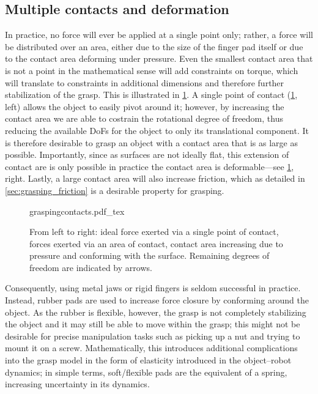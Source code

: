 \subsection{Multiple contacts and deformation}\label{sec:grasping_deformation}

In practice, no force will ever be applied at a single point only; rather, a force will be distributed over an area, either due to the size of the finger pad itself or due to the contact area deforming under pressure.
Even the smallest contact area that is not a point in the mathematical sense will add constraints on torque, which will translate to constraints in additional dimensions and therefore further stabilization of the grasp. This is illustrated in \cref{fig:contactarea}.
A single point of contact (\cref{fig:contactarea}, left) allows the object to easily pivot around it; however, by increasing the contact area we are able to costrain the rotational degree of freedom, thus reducing the available DoFs for the object to only its translational component.
It is therefore desirable to grasp an object with a contact area that is as large as possible. Importantly, since as surfaces are not ideally flat, this extension of contact are is only possible in practice the contact area is deformable---see \cref{fig:contactarea}, right. Lastly, a large contact area will also increase friction, which as detailed in \cref{sec:grasping_friction} is a desirable property for grasping.

\begin{figure}
    \def\svgwidth{\textwidth}
    {graspingcontacts.pdf_tex}
    \caption{From left to right: ideal force exerted via a single point of contact, forces exerted via an area of contact, contact area increasing due to pressure and conforming with the surface. Remaining degrees of freedom are indicated by arrows. \label{fig:contactarea}}
\end{figure}

Consequently, using metal jaws or rigid fingers is seldom successful in practice. Instead, rubber pads are used to increase force closure by conforming around the object. As the rubber is flexible, however, the grasp is not completely stabilizing the object and it may still be able to move within the grasp; this might not be desirable for precise manipulation tasks such as picking up a nut and trying to mount it on a screw. Mathematically, this introduces additional complications into the grasp model in the form of elasticity introduced in the object--robot dynamics; in simple terms, soft/flexible pads are the equivalent of a spring, increasing uncertainty in its dynamics.

